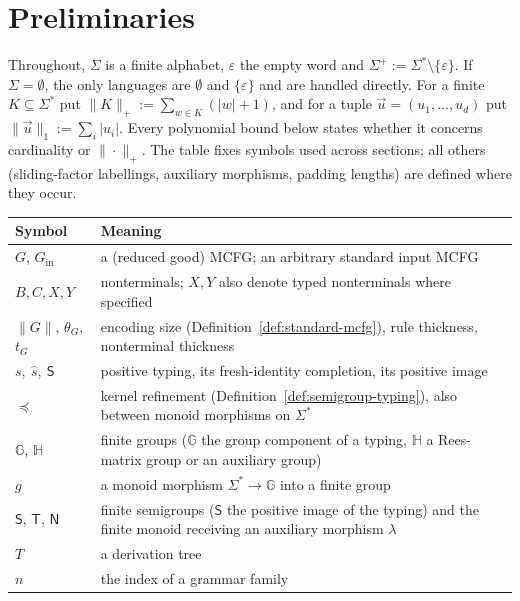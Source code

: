 \documentclass[11pt]{article}
\numberwithin{equation}{section}
\theoremstyle{plain}
\theoremstyle{definition}
\theoremstyle{remark}
\newcommand{\tuple}[1]{\vec{#1}}
\newcommand{\eps}{\varepsilon}
\begin{document}
\section{Preliminaries}
\label{sec:prelim}

Throughout, $\Sigma$ is a finite alphabet, $\eps$ the empty word and
$\Sigma^+:=\Sigma^*\setminus\{\eps\}$.  If $\Sigma=\emptyset$, the only
languages are $\emptyset$ and $\{\eps\}$ and are handled directly.  For a
finite $K\subseteq\Sigma^*$ put $\|K\|_+:=\sum_{w\in K}(|w|+1)$, and for a
tuple $\tuple u=(u_1,\ldots,u_d)$ put $\|\tuple u\|_1:=\sum_i|u_i|$.  Every
polynomial bound below states whether it concerns cardinality or
$\|\cdot\|_+$.  The table fixes symbols used across sections; all others
(sliding-factor labellings, auxiliary morphisms, padding lengths) are defined
where they occur.
\begin{center}
\footnotesize
\renewcommand{\arraystretch}{1.12}
\begin{tabularx}{\linewidth}{@{}lX@{}}
\hline
Symbol & Meaning\\
\hline
$G$, $G_{\mathrm{in}}$ & a (reduced good) MCFG; an arbitrary standard input MCFG\\
$B,C,X,Y$ & nonterminals; $X,Y$ also denote typed nonterminals where specified\\
$\|G\|$, $\theta_G$, $t_G$ & encoding size (Definition~\ref{def:standard-mcfg}), rule thickness, nonterminal thickness\\
$s,\ \widehat s,\ \mathsf S$ & positive typing, its fresh-identity completion, its positive image\\
$\preceq$ & kernel refinement (Definition~\ref{def:semigroup-typing}), also between monoid morphisms on $\Sigma^*$\\
$\mathbb G$, $\mathbb H$ & finite groups ($\mathbb G$ the group component of a typing, $\mathbb H$ a Rees-matrix group or an auxiliary group)\\
$g$ & a monoid morphism $\Sigma^*\to\mathbb G$ into a finite group\\
$\mathsf S$, $\mathsf T$, $\mathsf N$ & finite semigroups ($\mathsf S$ the positive image of the typing) and the finite monoid receiving an auxiliary morphism $\lambda$\\
$T$ & a derivation tree\\
$n$ & the index of a grammar family\\
\hline
\end{tabularx}
\end{center}
\end{document}
